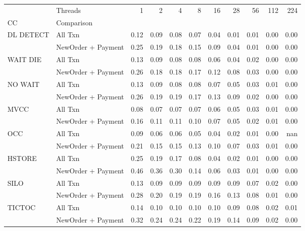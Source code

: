\begin{tabular}{llrrrrrrrrr}
\toprule
       & Threads &  1   &  2   &  4   &  8   &  16  &  28  &  56  &  112 &  224 \\
CC & Comparison &      &      &      &      &      &      &      &      &      \\
\midrule
DL DETECT & All Txn & 0.12 & 0.09 & 0.08 & 0.07 & 0.04 & 0.01 & 0.01 & 0.00 & 0.00 \\
       & NewOrder + Payment & 0.25 & 0.19 & 0.18 & 0.15 & 0.09 & 0.04 & 0.01 & 0.00 & 0.00 \\
WAIT DIE & All Txn & 0.13 & 0.09 & 0.08 & 0.08 & 0.06 & 0.04 & 0.02 & 0.00 & 0.00 \\
       & NewOrder + Payment & 0.26 & 0.18 & 0.18 & 0.17 & 0.12 & 0.08 & 0.03 & 0.00 & 0.00 \\
NO WAIT & All Txn & 0.13 & 0.09 & 0.08 & 0.08 & 0.07 & 0.05 & 0.03 & 0.01 & 0.00 \\
       & NewOrder + Payment & 0.26 & 0.19 & 0.19 & 0.17 & 0.13 & 0.09 & 0.02 & 0.00 & 0.00 \\
MVCC & All Txn & 0.08 & 0.07 & 0.07 & 0.07 & 0.06 & 0.05 & 0.03 & 0.01 & 0.00 \\
       & NewOrder + Payment & 0.16 & 0.11 & 0.11 & 0.10 & 0.07 & 0.05 & 0.02 & 0.01 & 0.00 \\
OCC & All Txn & 0.09 & 0.06 & 0.06 & 0.05 & 0.04 & 0.02 & 0.01 & 0.00 &  nan \\
       & NewOrder + Payment & 0.21 & 0.15 & 0.15 & 0.13 & 0.10 & 0.07 & 0.03 & 0.01 & 0.00 \\
HSTORE & All Txn & 0.25 & 0.19 & 0.17 & 0.08 & 0.04 & 0.02 & 0.01 & 0.00 & 0.00 \\
       & NewOrder + Payment & 0.46 & 0.36 & 0.30 & 0.14 & 0.06 & 0.03 & 0.01 & 0.00 & 0.00 \\
SILO & All Txn & 0.13 & 0.09 & 0.09 & 0.09 & 0.09 & 0.09 & 0.07 & 0.02 & 0.00 \\
       & NewOrder + Payment & 0.28 & 0.20 & 0.19 & 0.19 & 0.16 & 0.13 & 0.08 & 0.01 & 0.00 \\
TICTOC & All Txn & 0.14 & 0.10 & 0.10 & 0.10 & 0.10 & 0.09 & 0.08 & 0.02 & 0.01 \\
       & NewOrder + Payment & 0.32 & 0.24 & 0.24 & 0.22 & 0.19 & 0.14 & 0.09 & 0.02 & 0.00 \\
\bottomrule
\end{tabular}

